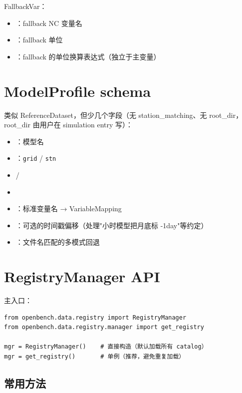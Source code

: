 FallbackVar：

\begin{itemize}
  \item {}：fallback NC 变量名
  \item {}：fallback 单位
  \item {}：fallback 的单位换算表达式（独立于主变量）
\end{itemize}

\section{ModelProfile schema}

类似 ReferenceDataset，但少几个字段（无 station\_matching、无 root\_dir，root\_dir 由用户在 simulation entry 写）：

\begin{itemize}
  \item {}：模型名
  \item {}：\texttt{grid} / \texttt{stn}
  \item {} / 
  \item {}
  \item {}：标准变量名 → VariableMapping
  \item {}：可选的时间戳偏移（处理"小时模型把月底标 -1day"等约定）
  \item {}：文件名匹配的多模式回退
\end{itemize}

\section{RegistryManager API}

主入口：

\begin{verbatim}
from openbench.data.registry import RegistryManager
from openbench.data.registry.manager import get_registry

mgr = RegistryManager()    # 直接构造（默认加载所有 catalog）
mgr = get_registry()       # 单例（推荐，避免重复加载）
\end{verbatim}

\subsection{常用方法}

